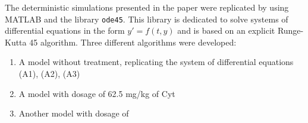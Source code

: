 The deterministic simulations presented in the paper were replicated by using MATLAB and the library \texttt{ode45}. This library is dedicated to solve systems of differential equations in the form $y'=f(t,y)$ and is based on an explicit Runge-Kutta 45 algorithm. 
Three different algorithms were developed:
\begin{enumerate}
	\item A model without treatment, replicating the system of differential equations (A1), (A2), (A3)
	\item A model with dosage of 62.5 mg/kg of Cyt
	\item Another model with dosage of
\end{enumerate}

